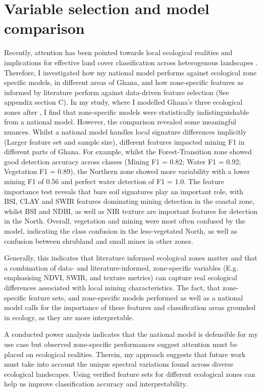 \documentclass[]{interact}
\begin{document}
\section{Variable selection and model comparison}
\label{app:benchmarks}
Recently, attention has been pointed towards local ecological realities and implications for effective land cover classification across heterogenous landscapes \citep{zhang2026Geographical,phiri2017Developments,shen2022bidirectional}. Therefore, I investigated how my national model performs against ecological zone specific models, in different areas of Ghana, and how zone-specific features as informed by literature perform against data-driven feature selection \citep{chen2025Spectral} (See appendix section C). In my study, where I modelled Ghana's three ecological zones after \citet{yamba2023Revisiting}, I find that zone-specific models were statistically indistinguishable from a national model. However, the comparison revealed some meaningful nuances. Whilst a national model handles local signature differences implicitly (Larger feature set and sample size), different features impacted mining F1 in different parts of Ghana. For example, whilst the Forest-Transition zone showed good detection accuracy across classes (Mining F1 = 0.82; Water F1 = 0.92; Vegetation F1 = 0.89), the Northern zone showed more variability with a lower mining F1 of 0.56 and perfect water detection of F1 = 1.0. The feature importance test reveals that bare soil signatures play an important role, with BSI, CLAY and SWIR features dominating mining detection in the coastal zone, whilst BSI and NDBI, as well as NIR texture are important features for detection in the North. Overall, vegetation and mining were most often confused by the model, indicating the class confusion in the less-vegetated North, as well as confusion between shrubland and small mines in other zones.

Generally, this indicates that literature informed ecological zones matter and that a combination of data- and literature-informed, zone-specific variables (E.g. emphasising NDVI, SWIR, and texture metrics) can capture real ecological differences associated with local mining characteristics. The fact, that zone-specific feature sets, and zone-specific models performed as well as a national model calls for the importance of these features and classification areas grounded in ecology, as they are more interpretable. 

A conducted power analysis \citep{buda2018systematic} indicates that the national model is defensible for my use case but observed zone-specific performances suggest attention must be placed on ecological realities. Therein, my approach suggests that future work must take into account the unique spectral variations found across diverse ecological landscapes. Using verified feature sets for different ecological zones can help us improve classification accuracy and interpretability.
\end{document}
